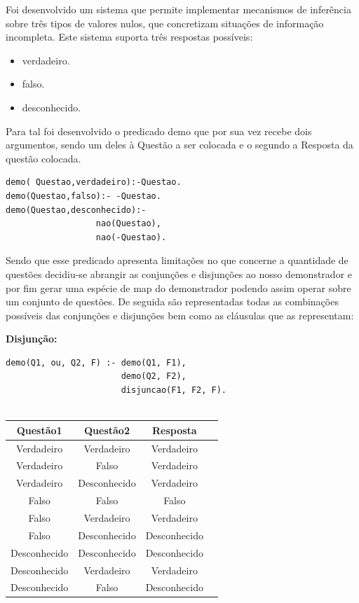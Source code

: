\documentclass[25pt]{article}
\begin{document}
Foi desenvolvido um sistema que permite implementar mecanismos de inferência sobre três tipos de valores nulos, que concretizam situações de informação incompleta. Este sistema suporta três respostas possíveis:
\begin{itemize}
\item verdadeiro.
\item falso.
\item desconhecido.
\end{itemize}

Para tal foi desenvolvido o predicado demo que por sua vez recebe dois argumentos, sendo um deles à Questão a ser colocada  e o segundo a 
Resposta da questão colocada.

\begin{lstlisting}
demo( Questao,verdadeiro):-Questao.
demo(Questao,falso):- -Questao.
demo(Questao,desconhecido):-
                  nao(Questao),
                  nao(-Questao).
\end{lstlisting}

Sendo que esse predicado apresenta limitações no que concerne a quantidade de questões decidiu-se abrangir as conjunções e disjunções ao nosso demonstrador e por fim gerar uma espécie de map do demonstrador podendo assim operar sobre um conjunto de questões.\newline
De seguida são representadas todas as combinações possíveis das conjunções e disjunções bem como as cláusulas que as representam:\newline

\textbf{Disjunção:}
\begin{lstlisting}
demo(Q1, ou, Q2, F) :- demo(Q1, F1),
                       demo(Q2, F2),
                       disjuncao(F1, F2, F).


\end{lstlisting}


\begin{center}
 \begin{tabular}{||c c c c||} 
 \hline
 Questão1 & Questão2 & Resposta \\ [0.5ex] 
 \hline\hline
 Verdadeiro & Verdadeiro & Verdadeiro \\ 
 \hline
 Verdadeiro & Falso & Verdadeiro \\
 \hline
 Verdadeiro & Desconhecido & Verdadeiro\\
 \hline
  Falso & Falso & Falso \\
 \hline
  Falso & Verdadeiro & Verdadeiro \\
 \hline
  Falso & Desconhecido & Desconhecido \\
 \hline
  Desconhecido & Desconhecido & Desconhecido \\
 \hline
  Desconhecido & Verdadeiro & Verdadeiro \\
 \hline
  Desconhecido & Falso & Desconhecido \\ [1ex] 
 \hline
\end{tabular}
\end{center}
\end{document}
